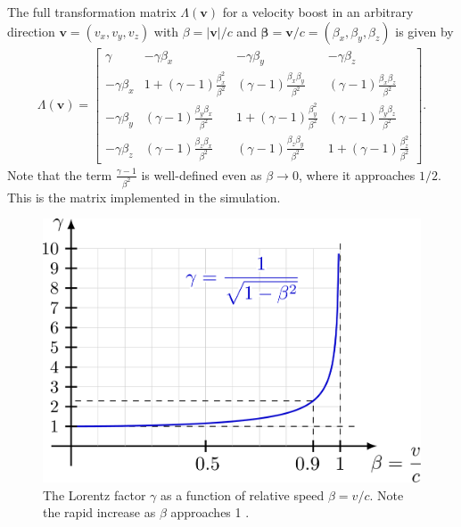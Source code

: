 \documentclass[a4paper]{article}
\begin{document}
The full transformation matrix $\Lambda(\mathbf{v})$ for a velocity boost in an arbitrary direction $\mathbf{v} = (v_x, v_y, v_z)$ with $\beta = |\mathbf{v}|/c$ and $\boldsymbol{\beta} = \mathbf{v}/c = (\beta_x, \beta_y, \beta_z)$ is given by
\begin{align}
    \label{Lambda}
    \Lambda(\mathbf{v}) = \begin{bmatrix}
    \gamma & -\gamma \beta_{x} & -\gamma \beta_{y} & -\gamma \beta_{z} \\
    -\gamma \beta_{x} & 1+ (\gamma - 1)\frac{\beta_{x}^{2}}{\beta^2} & (\gamma - 1)\frac{\beta_{x}\beta_{y}}{\beta^2} & (\gamma - 1)\frac{\beta_{x}\beta_{z}}{\beta^2} \\
    -\gamma \beta_{y} & (\gamma - 1)\frac{\beta_{y}\beta_{x}}{\beta^2}  &  1+(\gamma - 1)\frac{\beta_{y}^{2}}{\beta^2} & (\gamma - 1)\frac{\beta_{y}\beta_{z}}{\beta^2} \\
    -\gamma \beta_{z} & (\gamma - 1)\frac{\beta_{z}\beta_{x}}{\beta^2} & (\gamma - 1)\frac{\beta_{z}\beta_{y}}{\beta^2}  & 1+ (\gamma - 1)\frac{\beta_{z}^{2}}{\beta^2}
    \end{bmatrix}.
\end{align}
Note that the term $\frac{\gamma-1}{\beta^2}$ is well-defined even as $\beta \to 0$, where it approaches $1/2$. This is the matrix implemented in the simulation.

\begin{figure}[ht]
    \centering
    \includegraphics[width=0.5\linewidth]{img/gamma.png}
    \caption{The Lorentz factor $\gamma$ as a function of relative speed $\beta = v/c$. Note the rapid increase as $\beta$ approaches 1 \cite{tikz}.}
    \label{fig:gamma}
\end{figure}
\end{document}
